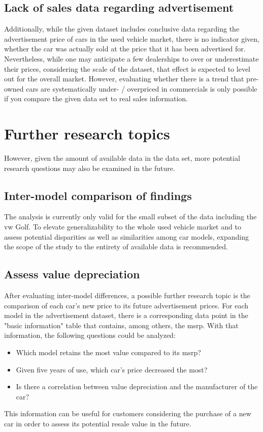 \subsection{Lack of sales data regarding advertisement}
Additionally, while the given dataset includes conclusive data regarding the advertisement price of cars in the used vehicle market,
there is no indicator given, whether the car was actually sold at the price that it has been advertised for. 
\newline
Nevertheless, while one may anticipate a few dealerships to over or underestimate their prices,
considering the scale of the dataset, that effect is expected to level out for the overall market.
However, evaluating whether there is a trend that pre-owned cars are systematically under- / overpriced in commercials
is only possible if you compare the given data set to real sales information.

\section{Further research topics}
However, given the amount of available data in the data set, more potential research questions may also be examined in the future. 

\subsection{Inter-model comparison of findings}
The analysis is currently only valid for the small subset of the data including the \ac{vw} Golf. 
To elevate generalizability to the whole used vehicle market and to assess potential disparities as well as similarities among
car models, expanding the scope of the study to the entirety of available data is recommended.  
\subsection{Assess value depreciation}
After evaluating inter-model differences, a possible further research topic is the comparison of each car's new price
to its future advertisement prices. For each model in the advertisement dataset, there is a corresponding data point
in the "basic information" table that contains, among others, the \ac{msrp}. 
\newline
With that information, the following questions could be analyzed: 
\begin{itemize}
\item Which model retains the most value compared to its \ac{msrp}?
\item Given five years of use, which car's price decreased the most?
\item Is there a correlation between value depreciation and the manufacturer of the car?
\end{itemize}
This information can be useful for customers considering the purchase of a new car in order to assess its potential resale value in the future.

